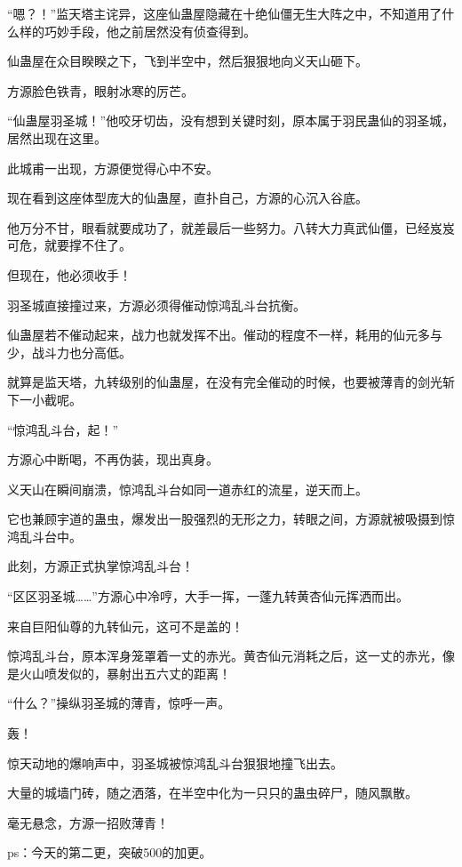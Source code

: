 \begin{this_body}
“嗯？！”监天塔主诧异，这座仙蛊屋隐藏在十绝仙僵无生大阵之中，不知道用了什么样的巧妙手段，他之前居然没有侦查得到。

仙蛊屋在众目睽睽之下，飞到半空中，然后狠狠地向义天山砸下。

方源脸色铁青，眼射冰寒的厉芒。

“仙蛊屋羽圣城！”他咬牙切齿，没有想到关键时刻，原本属于羽民蛊仙的羽圣城，居然出现在这里。

此城甫一出现，方源便觉得心中不安。

现在看到这座体型庞大的仙蛊屋，直扑自己，方源的心沉入谷底。

他万分不甘，眼看就要成功了，就差最后一些努力。八转大力真武仙僵，已经岌岌可危，就要撑不住了。

但现在，他必须收手！

羽圣城直接撞过来，方源必须得催动惊鸿乱斗台抗衡。

仙蛊屋若不催动起来，战力也就发挥不出。催动的程度不一样，耗用的仙元多与少，战斗力也分高低。

就算是监天塔，九转级别的仙蛊屋，在没有完全催动的时候，也要被薄青的剑光斩下一小截呢。

“惊鸿乱斗台，起！”

方源心中断喝，不再伪装，现出真身。

义天山在瞬间崩溃，惊鸿乱斗台如同一道赤红的流星，逆天而上。

它也兼顾宇道的蛊虫，爆发出一股强烈的无形之力，转眼之间，方源就被吸摄到惊鸿乱斗台中。

此刻，方源正式执掌惊鸿乱斗台！

“区区羽圣城……”方源心中冷哼，大手一挥，一蓬九转黄杏仙元挥洒而出。

来自巨阳仙尊的九转仙元，这可不是盖的！

惊鸿乱斗台，原本浑身笼罩着一丈的赤光。黄杏仙元消耗之后，这一丈的赤光，像是火山喷发似的，暴射出五六丈的距离！

“什么？”操纵羽圣城的薄青，惊呼一声。

轰！

惊天动地的爆响声中，羽圣城被惊鸿乱斗台狠狠地撞飞出去。

大量的城墙门砖，随之洒落，在半空中化为一只只的蛊虫碎尸，随风飘散。

毫无悬念，方源一招败薄青！

ps：今天的第二更，突破500的加更。

\end{this_body}

